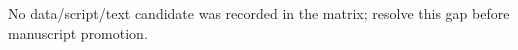 No data/script/text candidate was recorded in the matrix; resolve this gap before manuscript promotion.
